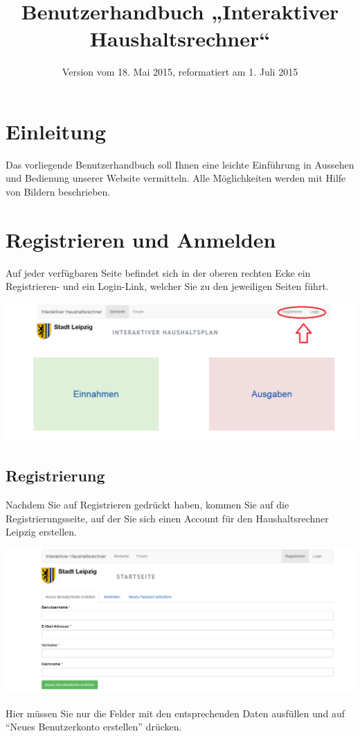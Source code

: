 \documentclass[a4paper,11pt,twoside]{article}
\title{Benutzerhandbuch „Interaktiver Haushaltsrechner“}
\date{Version vom 18. Mai 2015, reformatiert am 1. Juli 2015}
\begin{document}
\maketitle
\tableofcontents
\newpage
\seitezwei
\newpage

\section{Einleitung}
Das vorliegende Benutzerhandbuch soll Ihnen eine leichte Einf\"uhrung in
Aussehen und Bedienung unserer Website vermitteln. Alle M\"oglichkeiten werden
mit Hilfe von Bildern beschrieben.
\section{Registrieren und Anmelden}
Auf jeder verf\"ugbaren Seite befindet sich in der oberen rechten Ecke ein
Registrieren- und ein Login-Link, welcher Sie zu den jeweiligen Seiten
f\"uhrt.
\begin{center}
  \includegraphics[width=\textwidth]{Bilder/Anmeldung.png}
\end{center}

\subsection{Registrierung}
Nachdem Sie auf Registrieren gedr\"uckt haben, kommen Sie auf die
Registrierungsseite, auf der Sie sich einen Account f\"ur den Haushaltsrechner
Leipzig erstellen.
\begin{center}
  \includegraphics[width=\textwidth]{Bilder/registrierung.png}
\end{center}
Hier m\"ussen Sie nur die Felder mit den entsprechenden Daten ausf\"ullen und
auf "`Neues Benutzerkonto erstellen"' dr\"ucken.
\end{document}
